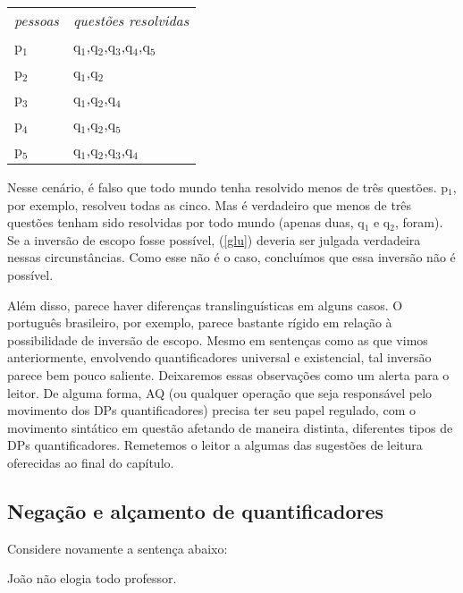 \begin{exe}
	\ex \begin{tabular}[t]{l l}
		\textit{pessoas} & \textit{questões resolvidas} \\ 
		p$_{1}$ &  q$_{1}$,q$_{2}$,q$_{3}$,q$_{4}$,q$_{5}$\\ 
		p$_{2}$ &  q$_{1}$,q$_{2}$\\ 
		p$_{3}$ &  q$_{1}$,q$_{2}$,q$_{4}$\\ 
		p$_{4}$ &  q$_{1}$,q$_{2}$,q$_{5}$\\ 
		p$_{5}$ &  q$_{1}$,q$_{2}$,q$_{3}$,q$_{4}$\\ 
	\end{tabular}
\end{exe}

\n Nesse cenário, é falso que todo mundo tenha resolvido menos de três questões. p$_{1}$, por exemplo, resolveu todas as cinco. Mas é verdadeiro que menos de três questões tenham sido resolvidas por todo mundo (apenas duas, q$_{1}$ e q$_{2}$, foram). Se a inversão de escopo fosse possível, (\ref{glu}) deveria ser julgada verdadeira nessas circunstâncias. Como esse não é o caso, concluímos que essa inversão não é possível.

Além disso, parece haver diferenças translinguísticas em alguns casos. O português brasileiro, por exemplo, parece bastante rígido em relação à possibilidade de inversão de escopo. Mesmo em sentenças como as que vimos anteriormente, envolvendo quantificadores universal e existencial, tal inversão parece bem pouco saliente. Deixaremos essas observações como um alerta para o leitor. De alguma forma, AQ (ou qualquer operação que seja responsável pelo movimento dos DPs quantificadores) precisa ter seu papel regulado, com o movimento sintático em questão afetando de maneira distinta,  diferentes tipos de DPs quantificadores. Remetemos o leitor a algumas das sugestões de leitura oferecidas ao final do capítulo. 



\subsection{Negação e alçamento de quantificadores}

Considere novamente a sentença abaixo:

\begin{exe}
    \ex João não elogia todo professor. \label{eloi}
\end{exe}

